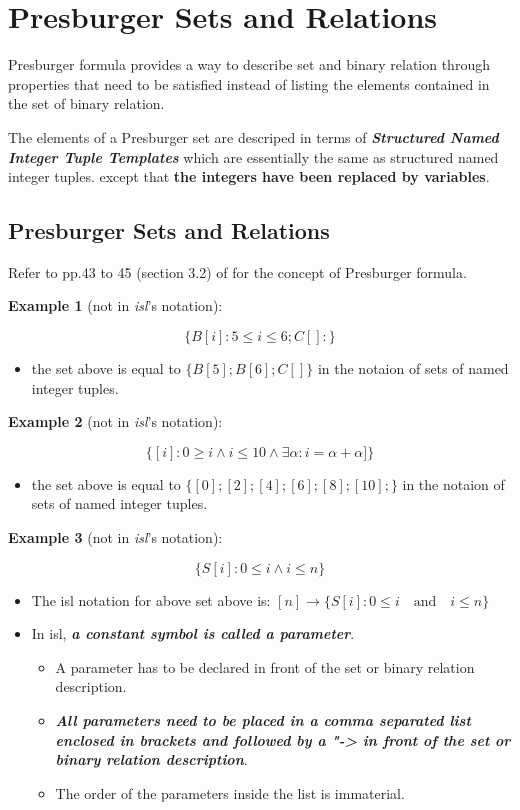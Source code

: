 \section{Presburger Sets and Relations}

Presburger formula provides a way to describe set and binary relation through properties that need to be satisfied instead of listing the elements contained in the set of binary relation.

The elements of a Presburger set are descriped in terms of \textcolor{vr}{\textbf{\emph{Structured Named Integer Tuple Templates}}} which are essentially the same as structured named integer tuples. except that \textbf{the integers have been replaced by variables}.


\subsection{Presburger Sets and Relations}

Refer to pp.43 to 45 (section 3.2) of \cite{verdoolaege2016presburger} for the concept of Presburger formula.

\textbf{Example 1} (not in \emph{isl}'s notation):

$$\{B[i]: 5 \le i \le 6; C[]: \}$$

\begin{itemize}
  \item the set above is equal to $\{B[5]; B[6]; C[]\}$ in the notaion of sets of named integer tuples.
\end{itemize}

\textbf{Example 2} (not in \emph{isl}'s notation):

$$\{ [i]: 0 \ge i \wedge i \le 10 \wedge \exists \alpha : i = \alpha + \alpha] \}$$

\begin{itemize}
  \item the set above is equal to $\{ [0]; [2]; [4]; [6]; [8]; [10]; \}$ in the notaion of sets of named integer tuples.
\end{itemize}

\textbf{Example 3} (not in \emph{isl}'s notation):

$$\{ S[i]: 0 \le i \wedge i \le n \}$$

\begin{itemize}
  \item The isl notation for above set above is: $[n] \rightarrow \{ S[i]: 0 \le i \quad \text{and} \quad i \le n \}$
  \item In isl, \textit{\textbf{a constant symbol is called a parameter}}.
  \begin{itemize}
    \item A parameter has to be declared in front of the set or binary relation description.
    \item \textit{\textbf{All parameters need to be placed in a comma separated list enclosed in brackets and followed by a "-> in front of the set or binary relation description}}.
    \item The order of the parameters inside the list is immaterial.
  \end{itemize}
\end{itemize}

